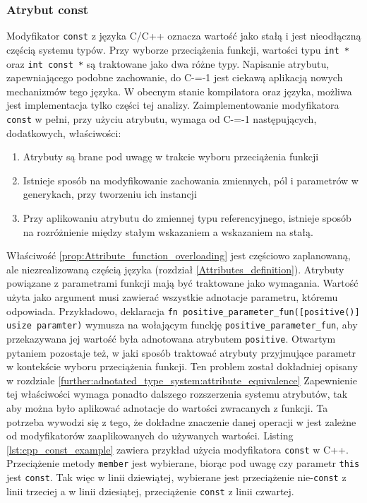 \subsubsection{Atrybut const}
\label{const}
Modyfikator \lstinline{const} z języka C/C++ oznacza wartość jako stałą i jest nieodłączną częścią systemu typów.
Przy wyborze przeciążenia funkcji, wartości typu \lstinline{int *} oraz \lstinline{int const *} są traktowane jako dwa różne typy.
Napisanie atrybutu, zapewniającego podobne zachowanie, do C-=-1 jest ciekawą aplikacją nowych mechanizmów tego języka.
W obecnym stanie kompilatora oraz języka, możliwa jest implementacja tylko części tej analizy.
Zaimplementowanie modyfikatora \lstinline{const} w pełni, przy użyciu atrybutu, wymaga od C-=-1 następujących, dodatkowych, właściwości:
\begin{enumerate}
  \item \label{prop:Attribute_function_overloading} Atrybuty są brane pod uwagę w trakcie wyboru przeciążenia funkcji
  \item \label{prop:Generic_adnotations} Istnieje sposób na modyfikowanie zachowania zmiennych, pól i parametrów w generykach, przy tworzeniu ich instancji
  \item \label{prop:Reference_adnotations} Przy aplikowaniu atrybutu do zmiennej typu referencyjnego, istnieje sposób na rozróżnienie między stałym wskazaniem a wskazaniem na stałą.
\end{enumerate}

Właściwość \ref{prop:Attribute_function_overloading} jest częściowo zaplanowaną, ale niezrealizowaną częścią języka (rozdział \ref{Attributes_definition}).
Atrybuty powiązane z parametrami funkcji mają być traktowane jako wymagania.
Wartość użyta jako argument musi zawierać wszystkie adnotacje parametru, któremu odpowiada.
Przykładowo, deklaracja \lstinline{fn positive_parameter_fun([positive()] usize paramter)} wymusza na wołającym funckję \lstinline{positive_parameter_fun}, aby przekazywana jej wartość była adnotowana atrybutem \lstinline{positive}.
Otwartym pytaniem pozostaje też, w jaki sposób traktować atrybuty przyjmujące parametr w kontekście wyboru przeciążenia funkcji.
Ten problem został dokładniej opisany w rozdziale \ref{further:adnotated_type_system:attribute_equivalence}
Zapewnienie tej właściwości wymaga ponadto dalszego rozszerzenia systemu atrybutów, tak aby można było aplikować adnotacje do wartości zwracanych z funkcji.
Ta potrzeba wywodzi się z tego, że dokładne znaczenie danej operacji w jest zależne od modyfikatorów zaaplikowanych do używanych wartości.
Listing \ref{lst:cpp_const_example} zawiera przykład użycia modyfikatora \lstinline{const} w C++.
Przeciążenie metody \lstinline{member} jest wybierane, biorąc pod uwagę czy parametr \lstinline{this} jest \lstinline{const}.
Tak więc w linii dziewiątej, wybierane jest przeciążenie nie-\lstinline{const} z linii trzeciej a w linii dziesiątej, przeciążenie \lstinline{const} z linii czwartej.

